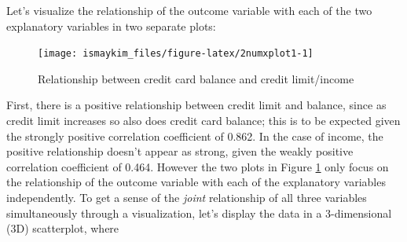 \documentclass[12pt, krantz2,]{krantz}
\makeatletter
\newenvironment{Shaded}{\begin{snugshade}}{\end{snugshade}}
\newcommand{\DataTypeTok}[1]{\textcolor[rgb]{0.27,0.27,0.27}{#1}}
\newcommand{\KeywordTok}[1]{\textcolor[rgb]{0.27,0.27,0.27}{\textbf{#1}}}
\newcommand{\NormalTok}[1]{#1}
\newcommand{\OperatorTok}[1]{\textcolor[rgb]{0.43,0.43,0.43}{\textbf{#1}}}
\newcommand{\OtherTok}[1]{\textcolor[rgb]{0.37,0.37,0.37}{#1}}
\newcommand{\StringTok}[1]{\textcolor[rgb]{0.5,0.5,0.5}{#1}}
\newenvironment{kframe}{%
\medskip{}
\setlength{\fboxsep}{.8em}
 \def\at@end@of@kframe{}%
 \ifinner\ifhmode%
  \def\at@end@of@kframe{\end{minipage}}%
  \begin{minipage}{\columnwidth}%
 \fi\fi%
 \def\FrameCommand##1{\hskip\@totalleftmargin \hskip-\fboxsep
 \colorbox{shadecolor}{##1}\hskip-\fboxsep
     \hskip-\linewidth \hskip-\@totalleftmargin \hskip\columnwidth}%
 \MakeFramed {\advance\hsize-\width
   \@totalleftmargin\z@ \linewidth\hsize
   \@setminipage}}%
 {\par\unskip\endMakeFramed%
 \at@end@of@kframe}
\renewenvironment{Shaded}{\begin{kframe}}{\end{kframe}}
\makeatother
\begin{document}
Let's visualize the relationship of the outcome variable with each of the two explanatory variables in two separate plots:

\begin{Shaded}
\end{Shaded}

\begin{figure}

{\centering \texttt{[image: ismaykim\_files/figure-latex/2numxplot1-1]} 

}

\caption{Relationship between credit card balance and credit limit/income}\label{fig:2numxplot1}
\end{figure}

First, there is a positive relationship between credit limit and balance, since as credit limit increases so also does credit card balance; this is to be expected given the strongly positive correlation coefficient of 0.862. In the case of income, the positive relationship doesn't appear as strong, given the weakly positive correlation coefficient of 0.464. However the two plots in Figure \ref{fig:2numxplot1} only focus on the relationship of the outcome variable with each of the explanatory variables independently. To get a sense of the \emph{joint} relationship of all three variables simultaneously through a visualization, let's display the data in a 3-dimensional (3D) scatterplot, where
\end{document}
